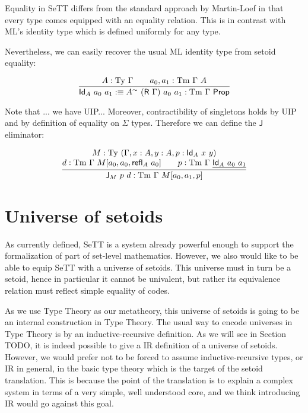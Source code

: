 \documentclass{easychair}
\newcommand{\refl}{\textsf{refl}}
\newcommand{\GG}{\Gamma}
\newcommand{\R}{\textsf{R}}
\newcommand{\Id}{\textsf{Id}}
\newcommand{\J}{\textsf{J}}
\newcommand{\tyj}[2]{#2 : \Ty\ #1}
\newcommand{\tmj}[3]{#2 : \Tm\ #1\ #3}
\newcommand{\Prop}{\textsf{Prop}}
\newcommand{\Ty}{\mathrm{Ty}}
\newcommand{\Tm}{\mathrm{Tm}}
\begin{document}
Equality in SeTT differs from the standard approach by Martin-Loef in that every
type comes equipped with an equality relation. This is in contrast with ML's
identity type which is defined uniformly for any type.

Nevertheless, we can easily recover the usual ML identity type from setoid
equality:

\[
\infer{
  \textsf{Id}_A\ a_0\ a_1 :\equiv A^{\sim}\ (\R\ \GG)\ a_0\ a_1 : \Tm\ \GG\ \Prop
}{
  \tyj{\GG}{A} \qquad \tmj{\GG}{a_0, a_1}{A}
}
\]

Note that ... we have UIP... Moreover, contractibility of singletons holds by
UIP and by definition of equality on $\Sigma$ types. Therefore we can define the
$\J$ eliminator:

\[
\infer{
  \tmj{\GG}{\J_M\ p\ d}{M[a_0, a_1, p]}
}{
  \deduce{
    \tmj{\GG}{d}{M[a_0, a_0, \refl_A\ a_0]}
    \qquad
    \tmj{\GG}{p}{\underline{\Id_A\ a_0\ a_1}}
  }{
  \tyj{(\GG, x : A, y : A, p : \Id_A\ x\ y)}{M}
  }
}
\]


\section{Universe of setoids}



As currently defined, SeTT is a system already powerful enough to support the
formalization of part of set-level mathematics. However, we also would like to
be able to equip SeTT with a universe of setoids. This universe must in turn be
a setoid, hence in particular it cannot be univalent, but rather its equivalence
relation must reflect simple equality of codes.

As we use Type Theory as our metatheory, this universe of setoids is going to be
an internal construction in Type Theory. The usual way to encode universes in
Type Theory is by an inductive-recursive definition. As we will see in Section
TODO, it is indeed possible to give a IR definition of a universe of setoids.
%
However, we would prefer not to be forced to assume inductive-recursive types,
or IR in general, in the basic type theory which is the target of the setoid
translation. This is because the point of the translation is to explain a
complex system in terms of a very simple, well understood core, and we think
introducing IR would go against this goal.
\end{document}
